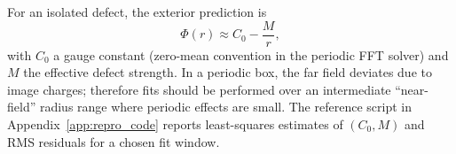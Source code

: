 For an isolated defect, the exterior prediction is
\begin{equation}
  \Phi(r) \approx C_0 - \frac{M}{r},
\end{equation}
with $C_0$ a gauge constant (zero-mean convention in the periodic FFT solver) and $M$ the effective defect strength.
In a periodic box, the far field deviates due to image charges; therefore fits should be performed over an intermediate ``near-field'' radius range where periodic effects are small.
The reference script in Appendix~\ref{app:repro_code} reports least-squares estimates of $(C_0,M)$ and RMS residuals for a chosen fit window.


